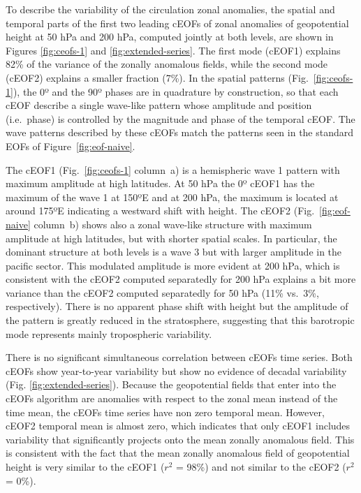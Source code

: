\documentclass[pdflatex,sn-basic]{sn-jnl}
\theoremstyle{thmstyleone}%
\theoremstyle{thmstyletwo}%
\theoremstyle{thmstylethree}%
\begin{document}
To describe the variability of the circulation zonal anomalies, the spatial and temporal parts of the first two leading cEOFs of zonal anomalies of geopotential height at 50 hPa and 200 hPa, computed jointly at both levels, are shown in Figures \ref{fig:ceofs-1} and \ref{fig:extended-series}.
The first mode (cEOF1) explains 82\% of the variance of the zonally anomalous fields, while the second mode (cEOF2) explains a smaller fraction (7\%).
In the spatial patterns (Fig.~\ref{fig:ceofs-1}), the 0º and the 90º phases are in quadrature by construction, so that each cEOF describe a single wave-like pattern whose amplitude and position (i.e.~phase) is controlled by the magnitude and phase of the temporal cEOF.
The wave patterns described by these cEOFs match the patterns seen in the standard EOFs of Figure~\ref{fig:eof-naive}.

The cEOF1 (Fig.~\ref{fig:ceofs-1} column~a) is a hemispheric wave 1 pattern with maximum amplitude at high latitudes.
At 50 hPa the 0º cEOF1 has the maximum of the wave 1 at 150ºE and at 200 hPa, the maximum is located at around 175ºE indicating a westward shift with height.
The cEOF2 (Fig.~\ref{fig:eof-naive} column~b) shows also a zonal wave-like structure with maximum amplitude at high latitudes, but with shorter spatial scales.
In particular, the dominant structure at both levels is a wave 3 but with larger amplitude in the pacific sector.
This modulated amplitude is more evident at 200 hPa, which is consistent with the cEOF2 computed separatedly for 200 hPa explains a bit more variance than the cEOF2 computed separatedly for 50 hPa (11\% vs.~3\%, respectively).
There is no apparent phase shift with height but the amplitude of the pattern is greatly reduced in the stratosphere, suggesting that this barotropic mode represents mainly tropospheric variability.

There is no significant simultaneous correlation between cEOFs time series.
Both cEOFs show year-to-year variability but show no evidence of decadal variability (Fig. \ref{fig:extended-series}).
Because the geopotential fields that enter into the cEOFs algorithm are anomalies with respect to the zonal mean instead of the time mean, the cEOFs time series have non zero temporal mean.
However, cEOF2 temporal mean is almost zero, which indicates that only cEOF1 includes variability that significantly projects onto the mean zonally anomalous field.
This is consistent with the fact that the mean zonally anomalous field of geopotential height is very similar to the cEOF1 (\(r^2\) = 98\%) and not similar to the cEOF2 (\(r^2\) = 0\%).
\end{document}
